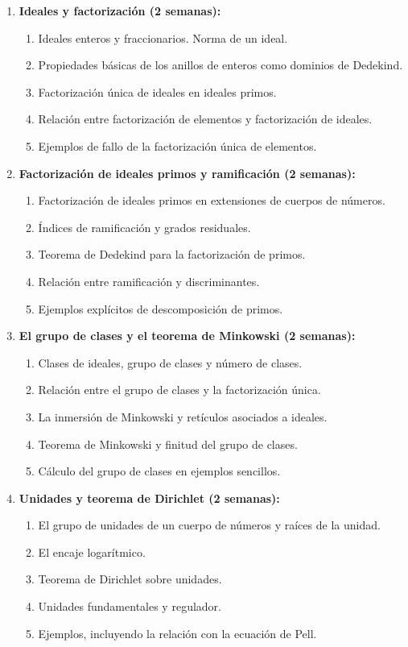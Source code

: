 \begin{refsection}
\begin{enumerate}
\item \textbf{Ideales y factorización (2 semanas):}
\begin{enumerate}
\item Ideales enteros y fraccionarios. Norma de un ideal.
\item Propiedades básicas de los anillos de enteros como dominios de Dedekind.
\item Factorización única de ideales en ideales primos.
\item Relación entre factorización de elementos y factorización de ideales.
\item Ejemplos de fallo de la factorización única de elementos.
\end{enumerate}

\item \textbf{Factorización de ideales primos y ramificación (2 semanas):}
\begin{enumerate}
\item Factorización de ideales primos en extensiones de cuerpos de números.
\item Índices de ramificación y grados residuales.
\item Teorema de Dedekind para la factorización de primos.
\item Relación entre ramificación y discriminantes.
\item Ejemplos explícitos de descomposición de primos.
\end{enumerate}

\item \textbf{El grupo de clases y el teorema de Minkowski (2 semanas):}
\begin{enumerate}
\item Clases de ideales, grupo de clases y número de clases.
\item Relación entre el grupo de clases y la factorización única.
\item La inmersión de Minkowski y retículos asociados a ideales.
\item Teorema de Minkowski y finitud del grupo de clases.
\item Cálculo del grupo de clases en ejemplos sencillos.
\end{enumerate}

\item \textbf{Unidades y teorema de Dirichlet (2 semanas):}
\begin{enumerate}
\item El grupo de unidades de un cuerpo de números y raíces de la unidad.
\item El encaje logarítmico.
\item Teorema de Dirichlet sobre unidades.
\item Unidades fundamentales y regulador.
\item Ejemplos, incluyendo la relación con la ecuación de Pell.
\end{enumerate}


\end{enumerate}
\end{refsection}
